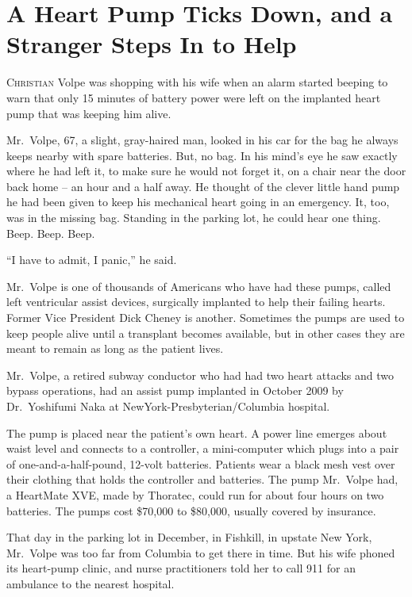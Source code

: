 ﻿\documentclass[12pt]{article}
\begin{document}
\section{A Heart Pump Ticks Down, and a Stranger Steps In to Help}

\lettrine{C}{hristian} Volpe was shopping with his wife when an alarm
started beeping to warn that only 15 minutes of battery power were left on the implanted heart pump
that was keeping him alive.

Mr.~Volpe, 67, a slight, gray-haired man, looked in his car for the bag he always keeps nearby with
spare batteries. But, no bag. In his mind's eye he saw exactly where he had left it, to make sure he
would not forget it, on a chair near the door back home -- an hour and a half away. He thought of
the clever little hand pump he had been given to keep his mechanical heart going in an emergency.
It, too, was in the missing bag. Standing in the parking lot, he could hear one thing. Beep. Beep.
Beep.

``I have to admit, I panic,'' he said.

Mr.~Volpe is one of thousands of Americans who have had these pumps, called left ventricular assist
devices, surgically implanted to help their failing hearts. Former Vice President Dick Cheney is
another. Sometimes the pumps are used to keep people alive until a transplant becomes available, but
in other cases they are meant to remain as long as the patient lives.

Mr.~Volpe, a retired subway conductor who had had two heart attacks and two bypass operations, had
an assist pump implanted in October 2009 by Dr.~Yoshifumi Naka at NewYork-Presbyterian/Columbia
hospital.

The pump is placed near the patient's own heart. A power line emerges about waist level and connects
to a controller, a mini-computer which plugs into a pair of one-and-a-half-pound, 12-volt batteries.
Patients wear a black mesh vest over their clothing that holds the controller and batteries. The
pump Mr.~Volpe had, a HeartMate XVE, made by Thoratec, could run for about four hours on two
batteries. The pumps cost \$70,000 to \$80,000, usually covered by insurance.

That day in the parking lot in December, in Fishkill, in upstate New York, Mr.~Volpe was too far
from Columbia to get there in time. But his wife phoned its heart-pump clinic, and nurse
practitioners told her to call 911 for an ambulance to the nearest hospital.
\end{document}
